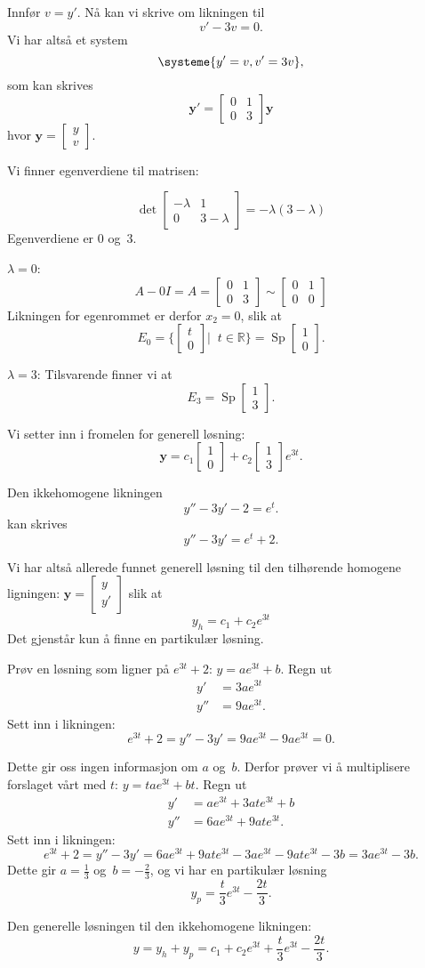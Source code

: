\documentclass[titlepage,a4paper,12pt,norsk]{IMFeksamen}
\DeclareMathOperator{\Sp}{Sp}
\newcommand{\V}[1]{\mathbf{#1}}
\newcommand{\vv}[2]{\begin{bmatrix} #1 \\ #2 \end{bmatrix}}
\newcommand{\0}{\V{0}}
\begin{document}
\begin{oppgave}
Innfør $v=y'$. Nå kan vi skrive om likningen til 
\[
v'-3v=0.
\]
Vi har altså et system
\[
\systeme{
y'=v,
v'=3v
},
\]
som kan skrives 
\[
\V{y}'=\begin{bmatrix}
0 & 1\\
0 & 3
\end{bmatrix}\V{y}
\]
hvor $\V{y}=\vv{y}{v}$.

Vi finner egenverdiene til matrisen:

\[
\det \begin{bmatrix}
-\lambda & 1\\
0 & 3-\lambda
\end{bmatrix}=-\lambda(3-\lambda)
\]
Egenverdiene er $0$ og~$3$. 


$\lambda=0$: 
\[
A-0I=A=\begin{bmatrix}
0 & 1\\
0 & 3
\end{bmatrix}\sim
\begin{bmatrix}
0 & 1\\
0 & 0
\end{bmatrix}
\]
Likningen for egenrommet er derfor $x_2=0$, slik at \[
E_0=\{\vv{t}{0}|\;\; t\in \mathbb{R}\}=\Sp\vv{1}{0}.
\]

$\lambda=3$: Tilsvarende finner vi at 
\[
E_3=\Sp\vv{1}{3}.
\]

Vi setter inn i fromelen for generell løsning:
\[
\V{y} =c_1\vv{1}{0}+c_2\vv{1}{3}e^{3t}.
\]

Den ikkehomogene likningen 
\[
y''-3y'-2 = e^t.
\]
kan skrives
\[
y''-3y' = e^t+2.
\]

Vi har altså allerede funnet generell løsning til den tilhørende homogene ligningen: $\V{y}=\vv{y}{y'}$ slik at 
\[
y_h=c_1+c_2e^{3t}
\]
Det gjenstår kun å finne en partikulær løsning.

Prøv en løsning som ligner på $e^{3t}+2$: $y=ae^{3t}+b$. Regn ut 
\begin{align*}
y'&=3ae^{3t}\\
y''&=9ae^{3t}.
\end{align*}
Sett inn i likningen:
\[
e^{3t}+2=y''-3y'=9ae^{3t}-9ae^{3t}=0.
\]

Dette gir oss ingen informasjon om $a$ og~$b$. Derfor prøver vi å multiplisere forslaget vårt med $t$: $y=tae^{3t}+bt$. Regn ut
\begin{align*}
y'&=ae^{3t}+3ate^{3t}+b\\
y''&=6ae^{3t}+9ate^{3t}.
\end{align*}
Sett inn i likningen:
\[
e^{3t}+2=y''-3y'=6ae^{3t}+9ate^{3t}-3ae^{3t}-9ate^{3t}-3b=3ae^{3t}-3b.
\]
Dette gir $a=\frac{1}{3}$ og~$b=-\frac{2}{3}$, og vi har en partikulær løsning
\[
y_p=\frac{t}{3}e^{3t}-\frac{2t}{3}.
\]


Den generelle løsningen til den ikkehomogene likningen:
\[
y=y_h+y_p=c_1+c_2e^{3t}+\frac{t}{3}e^{3t}-\frac{2t}{3}.
\]

\end{oppgave}
\end{document}
